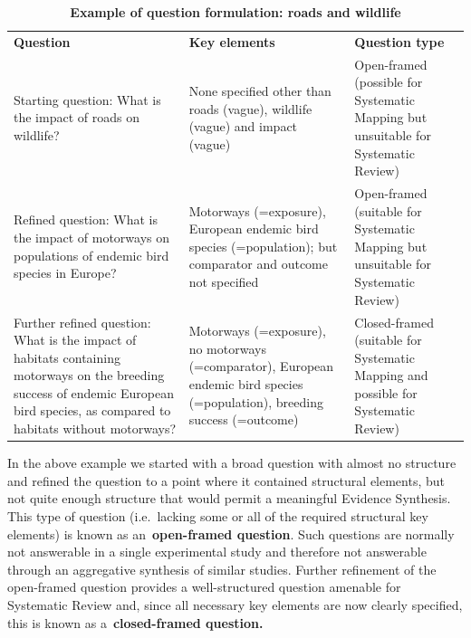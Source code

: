\documentclass[
  letterpaper,
  DIV=11,
  numbers=noendperiod]{scrreprt}
\begin{document}
\begin{longtable}[]{@{}
  >{\raggedright\arraybackslash}p{}
  >{\raggedright\arraybackslash}p{}
  >{\raggedright\arraybackslash}p{}@{}}
\caption{\textbf{Example of question formulation: roads and
wildlife}}\label{tbl-roads}\tabularnewline
\toprule\noalign{}
\endfirsthead
\endhead
\bottomrule\noalign{}
\endlastfoot
\textbf{Question} & \textbf{Key elements} & \textbf{Question type} \\
Starting question: What is the impact of roads on wildlife? & None
specified other than roads (vague), wildlife (vague) and impact (vague)
& Open-framed (possible for Systematic Mapping but unsuitable for
Systematic Review) \\
Refined question: What is the impact of motorways on populations of
endemic bird species in Europe? & Motorways (=exposure), European
endemic bird species (=population); but comparator and outcome not
specified & Open-framed (suitable for Systematic Mapping but unsuitable
for Systematic Review) \\
Further refined question: What is the impact of habitats containing
motorways on the breeding success of endemic European bird species, as
compared to habitats without motorways? & Motorways (=exposure), no
motorways (=comparator), European endemic bird species (=population),
breeding success (=outcome) & Closed-framed (suitable for Systematic
Mapping and possible for Systematic Review) \\
\end{longtable}

In the above example we started with a broad question with almost no
structure and refined the question to a point where it contained
structural elements, but not quite enough structure that would permit a
meaningful Evidence Synthesis. This type of question (i.e.~lacking some
or all of the required structural key elements) is known as
an~\textbf{open-framed question}. Such questions are normally not
answerable in a single experimental study and therefore not answerable
through an aggregative synthesis of similar studies. Further refinement
of the open-framed question provides a well-structured question amenable
for Systematic Review and, since all necessary key elements are now
clearly specified, this is known as a~\textbf{closed-framed question.}
\end{document}
